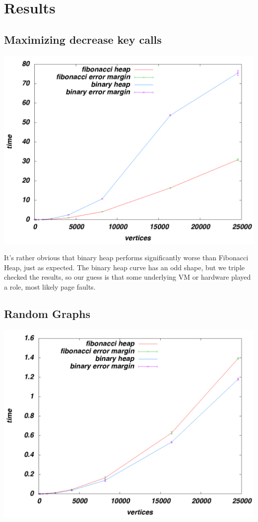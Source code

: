 \section*{Results}
\subsection*{Maximizing decrease key calls}
\includegraphics[scale=0.30]{../results/fibonacci-binary-dkmax2.png}
 
It's rather obvious that binary heap performs significantly worse than Fibonacci Heap, just as expected. The binary heap curve has an odd shape, but we triple checked the results, so our guess is that some underlying VM or hardware played a role, most likely page faults.
\subsection*{Random Graphs}
\includegraphics[scale=0.30]{../results/fibonacci-binary-random.png}


